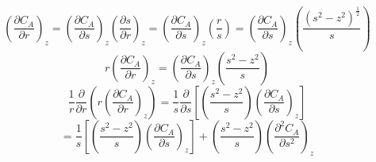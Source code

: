 \begin{equation*}
    (\frac{\partial C_A}{\partial r})_z=(\frac{\partial C_A}{\partial s})_z(\frac{\partial s}{\partial r})_z=(\frac{\partial C_A}{\partial s})_z(\frac{r}{s})=(\frac{\partial C_A}{\partial s})_z(\frac{(s^2-z^2)^\frac{1}{2}}{s})
\end{equation*}
\begin{equation*}
     r(\frac{\partial C_A}{\partial r})_z=(\frac{\partial C_A}{\partial s})_z(\frac{s^2-z^2}{s})
\end{equation*}
\begin{equation*}
    \frac{1}{r}\frac{\partial}{\partial r}(r(\frac{\partial C_A}{\partial r})_z)=\frac{1}{s}\frac{\partial}{\partial s}[(\frac{s^2-z^2}{s})(\frac{\partial C_A}{\partial s})_z]
\end{equation*}
\begin{equation*}
    =\frac{1}{s}[(\frac{s^2-z^2}{s})(\frac{\partial C_A}{\partial s})_z]+(\frac{s^2-z^2}{s})(\frac{\partial^2C_A}{\partial s^2})_z
\end{equation*}

